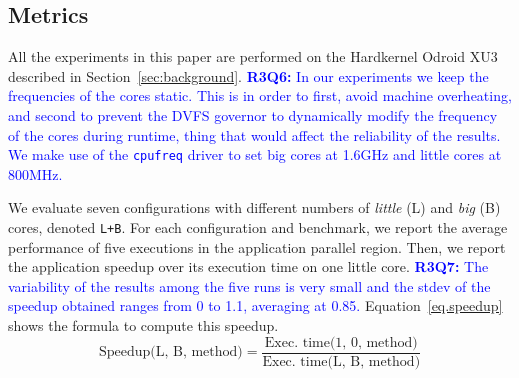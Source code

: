 \subsection{Metrics}
\label{sec:metrics}

All the experiments in this paper are performed on the Hardkernel Odroid XU3 described in Section~\ref{sec:background}. 
\textcolor{blue}{
\textbf{R3Q6: }In our experiments we keep the frequencies of the cores static.
This is in order to first, avoid machine overheating, and second to prevent the DVFS governor to dynamically modify the frequency of the cores during runtime, thing that would affect the reliability of the results.
We make use of the \texttt{cpufreq} driver to set big cores at 1.6GHz and little cores at 800MHz. 
}

We evaluate seven configurations with different numbers of \textit{little} (L) and \textit{big} (B) cores, denoted \texttt{L+B}.
For each configuration and benchmark, we report the average performance of five executions in the application parallel region. Then, we report the application speedup over its execution time on one little core.
\textcolor{blue}{\textbf{R3Q7: }The variability of the results among the five runs is very small and the stdev of the speedup obtained ranges from 0 to 1.1, averaging at 0.85.}
Equation~\ref{eq.speedup} shows the formula to compute this speedup.
\begingroup\makeatletter\def\f@size{9}\check@mathfonts
\begin{equation}
  \text{Speedup(L, B, method)} = \frac{\text{Exec. time(1, 0, method)}}{\text{Exec. time(L, B, 
method)}}
\label{eq.speedup}
\end{equation}
\endgroup


